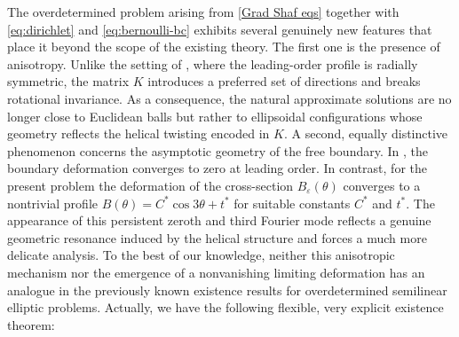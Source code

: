 \documentclass[12pt,reqno]{amsart}
\numberwithin{equation}{section}
\theoremstyle{definition}
\theoremstyle{remark}
\begin{document}
The overdetermined problem arising from \eqref{Grad Shaf eqs} together with \eqref{eq:dirichlet} and \eqref{eq:bernoulli-bc} exhibits several genuinely new features that place it beyond the scope of the existing theory. The first one is the presence of anisotropy. Unlike the setting of \cite{DominguezVazquezEncisoPeraltaSalas2021}, where the leading-order profile is radially symmetric, the matrix $K$ introduces a preferred set of directions and breaks rotational invariance. As a consequence, the natural approximate solutions are no longer close to Euclidean balls but rather to ellipsoidal configurations whose geometry reflects the helical twisting encoded in $K$. A second, equally distinctive phenomenon concerns the asymptotic geometry of the free boundary. In \cite{DominguezVazquezEncisoPeraltaSalas2021}, the boundary deformation converges to zero at leading order. In contrast, for the present problem the deformation of the cross-section $B_\varepsilon(\theta)$ converges to a nontrivial profile
$ B(\theta)=C^*\cos 3\theta +t^* $ for suitable constants $C^*$ and $t^*$. The appearance of this persistent zeroth and third Fourier mode reflects a genuine geometric resonance induced by the helical structure and forces a much more delicate analysis. To the best of our knowledge, neither this anisotropic mechanism nor the emergence of a nonvanishing limiting deformation has an analogue in the previously known existence results for overdetermined semilinear elliptic problems. Actually, we have the following flexible, very explicit existence theorem: %
%
\end{document}
